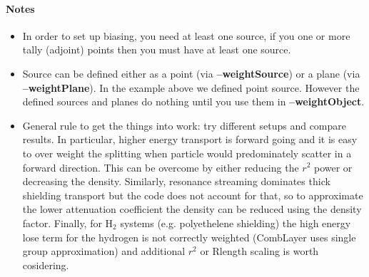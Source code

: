 \begin{description}
\begin{description}
\end{description}

\paragraph{Notes}
\begin{itemize}
\item In order to set up biasing, you need at least one source, if you one or more tally (adjoint) points then you must have at least one source.

\item Source can be defined either as a point (via {\bf --weightSource}) or a plane (via {\bf --weightPlane}).
  In the example above we defined point source. However the defined sources and planes do nothing until you use them in
  {\bf --weightObject}.
  
\item General rule to get the things into work: try different setups and compare results. In particular, higher energy
  transport is forward going and it is easy to over weight the splitting when particle would predominately scatter
  in a forward direction. This can be overcome by either reducing the $r^2$ power or decreasing the density.
  Similarly, resonance streaming dominates thick shielding transport but the code does not account for that, so to
  approximate the lower attenuation coefficient the density can be reduced using the density factor. Finally,
  for H$_2$ systems (e.g. polyethelene shielding) the high energy lose term for the hydrogen is not correctly
  weighted (CombLayer uses single group approximation) and additional $r^2$ or Rlength scaling is worth cosidering.

\end{itemize}





\end{description}

